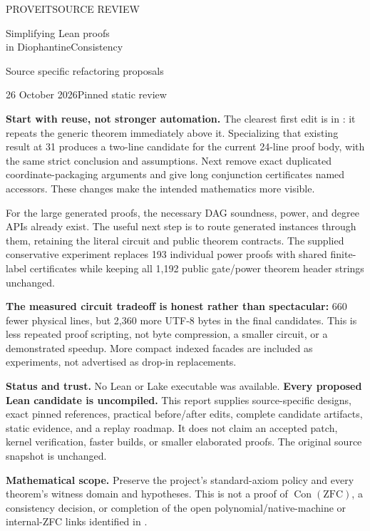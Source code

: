 \thispagestyle{empty}
{\sffamily\small PROVEIT\quad SOURCE REVIEW\par}
\vspace{10pt}
{\fontsize{25}{29}\selectfont\bfseries\raggedright Simplifying Lean proofs\\in DiophantineConsistency\par}
\vspace{8pt}
{\large Source specific refactoring proposals\par}
\vspace{7pt}
26 October 2026\qquad Pinned static review
\vspace{15pt}

\textbf{Start with reuse, not stronger automation.} The clearest first edit
is  in : it repeats the
generic theorem immediately above it. Specializing that existing result at
31 produces a two-line candidate for the current 24-line proof body, with
the same strict conclusion and assumptions. Next remove exact duplicated
coordinate-packaging arguments and give long conjunction certificates named
accessors. These changes make the intended mathematics more visible.

For the large generated proofs, the necessary DAG soundness, power, and
degree APIs already exist. The useful next step is to route generated
instances through them, retaining the literal circuit and public theorem
contracts. The supplied conservative experiment replaces 193 individual
power  proofs with shared finite-label certificates while keeping
all 1,192 public gate/power theorem header strings unchanged.

\textbf{The measured circuit tradeoff is honest rather than spectacular:}
660 fewer physical lines, but 2,360 more UTF-8 bytes in the final candidates.
This is less repeated proof scripting, not byte compression, a smaller
circuit, or a demonstrated speedup. More compact indexed facades are
included as experiments, not advertised as drop-in replacements.

\textbf{Status and trust.} No Lean or Lake executable was available.
\textbf{Every proposed Lean candidate is uncompiled.} This report supplies
source-specific designs, exact pinned references, practical before/after
edits, complete candidate artifacts, static evidence, and a replay roadmap.
It does not claim an accepted patch, kernel verification, faster builds,
or smaller elaborated proofs. The original source snapshot is unchanged.

\textbf{Mathematical scope.} Preserve the project's standard-axiom policy
and every theorem's witness domain and hypotheses. This is not a proof of
\(\operatorname{Con}(\mathrm{ZFC})\), a consistency decision, or completion
of the open polynomial/native-machine or internal-ZFC links identified in
.

